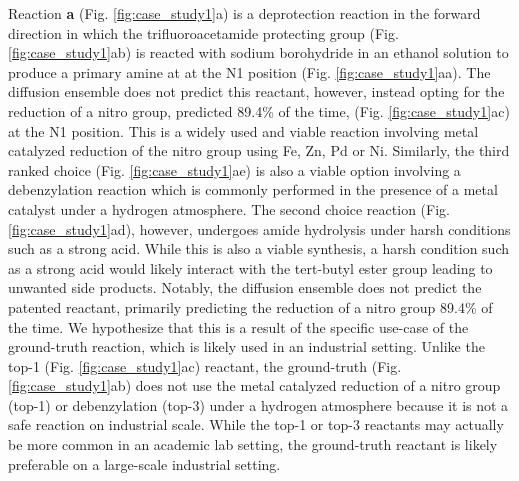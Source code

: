 \documentclass{article}
\begin{document}
Reaction \textbf{a} (Fig. \ref{fig:case_study1}a) is a deprotection reaction in the forward direction in which the trifluoroacetamide protecting group (Fig. \ref{fig:case_study1}ab) is reacted with sodium borohydride in an ethanol solution to produce a primary amine at at the N1 position (Fig. \ref{fig:case_study1}aa). The diffusion ensemble does not predict this reactant, however, instead opting for the reduction of a nitro group, predicted 89.4\% of the time, (Fig. \ref{fig:case_study1}ac) at the N1 position. This is a widely used and viable reaction involving metal catalyzed reduction of the nitro group using Fe, Zn, Pd or Ni. Similarly, the third ranked choice (Fig. \ref{fig:case_study1}ae) is also a viable option involving a debenzylation reaction which is commonly performed in the presence of a metal catalyst under a hydrogen atmosphere. The second choice reaction (Fig. \ref{fig:case_study1}ad), however, undergoes amide hydrolysis under harsh conditions such as a strong acid. While this is also a viable synthesis, a harsh condition such as a strong acid would likely interact with the tert-butyl ester group leading to unwanted side products. Notably, the diffusion ensemble does not predict the patented reactant, primarily predicting the reduction of a nitro group 89.4\% of the time. We hypothesize that this is a result of the specific use-case of the ground-truth reaction, which is likely used in an industrial setting. Unlike the top-1 (Fig. \ref{fig:case_study1}ac) reactant, the ground-truth (Fig. \ref{fig:case_study1}ab) does not use the metal catalyzed reduction of a nitro group (top-1) or debenzylation (top-3) under a hydrogen atmosphere because it is not a safe reaction on industrial scale. While the top-1 or top-3 reactants may actually be more common in an academic lab setting, the ground-truth reactant is likely preferable on a large-scale industrial setting.
\end{document}

